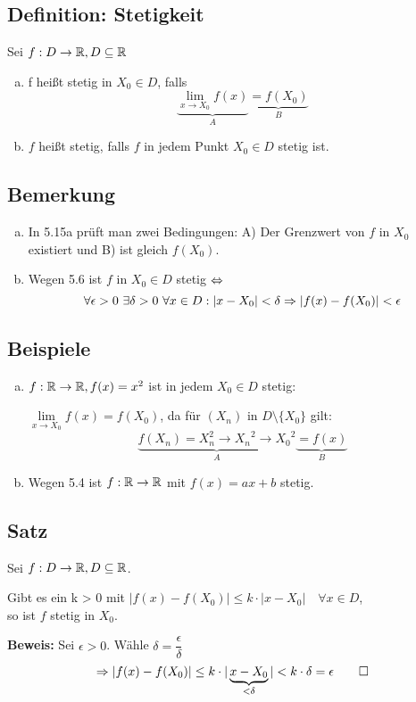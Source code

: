 \documentclass[10pt, a4paper, fleqn]{article}
\begin{document}
\subsection{Definition: Stetigkeit}
Sei $f: D \to \mathbb{R}, D \subseteq \mathbb{R}$
\begin{enumerate}[a)]
    \item f heißt stetig in $X_0 \in D$, falls
    \[
        \underbrace{\lim_{x \to X_0} f(x)}_A \underbrace{= f(X_0)}_B    
    \]
    \item $f$ heißt stetig, falls $f$ in jedem Punkt $X_0 \in D$ stetig ist.
\end{enumerate}

\subsection{Bemerkung}
\begin{enumerate}[a)]
    \item In 5.15a prüft man zwei Bedingungen: A) Der Grenzwert von $f$ in $X_0$ existiert und 
    B) ist gleich $f(X_0)$.

    \item Wegen 5.6 ist $f$ in $X_0 \in D$ stetig $\Leftrightarrow$
    \[
        \forall \epsilon > 0 \ \exists \delta > 0 \ \forall x \in D: |x-X_0| < \delta
        \imp |f(x) - f(X_0)| < \epsilon    
    \]
\end{enumerate}

\subsection{Beispiele}
\begin{enumerate}[a)] 
    \item $f: \mathbb{R} \to \mathbb{R}, f(x) = x^2$ ist in jedem $X_0 \in D$ stetig:

    $\lim\limits_{x \to X_0} f(x) = f(X_0)$, da für $(X_n)$ in $D \setminus \{X_0\}$ gilt:
    \[
        \underbrace{f(X_n) = X_n^2 \to {X_n}^2 \to {X_0}^2}_{A} \underbrace{= f(x)}_{B}    
    \]
    \item Wegen 5.4 ist $f: \mathbb{R} \to \mathbb{R}$ mit $f(x) = ax + b$ stetig.
\end{enumerate}

\subsection{Satz}
Sei $f: D \to \mathbb{R}, D \subseteq \mathbb{R}$.

Gibt es ein k > 0 mit $|f(x) - f(X_0)| \leq k \cdot |x - X_0| \quad \forall x \in D$, \\
so ist $f$ stetig in $X_0$.

\textbf{Beweis: }
Sei $\epsilon > 0$. Wähle $\delta = \dfrac{\epsilon}{\delta}$
\[
    \Rightarrow |f(x) - f(X_0)| \leq k \cdot |\underbrace{x - X_0}_{< \delta}| < k \cdot \delta = \epsilon \qed   
\]

\ifdefined\MAINDOC\else
\end{document}
